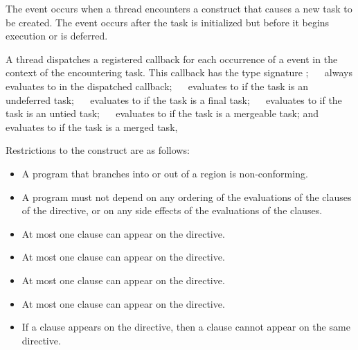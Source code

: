 \events

The  event occurs when a thread encounters a construct
that causes a new task to be created. The event occurs after the task is 
initialized but before it begins execution or is deferred.

\tools

A thread dispatches a registered  callback 
for each occurrence of a  event in the context of the 
encountering task. This callback has the type signature 
; 
\code{(}~\code{&}~ 
always evaluates to  in the dispatched callback;
\code{(}~\code{&}~ evaluates to  
if the task is an undeferred task; \code{(}~\code{&}~
evaluates to  if the task is a final task;
\code{(}~\code{&}~ evaluates to  if 
the task is an untied task; \code{(}~\code{&}~ 
evaluates to  if the task is a mergeable task; and
\code{(}~\code{&}~ evaluates to 
if the task is a merged task, 

\restrictions
Restrictions to the  construct are as follows:

\begin{itemize}
\item A program that branches into or out of a  region is non-conforming.
\item A program must not depend on any ordering of the evaluations of the clauses 
      of the  directive, or on any side effects of the evaluations of 
      the clauses.
\item At most one  clause can appear on the directive.
\item At most one  clause can appear on the directive.
\item At most one  clause can appear on the directive.
\item At most one  clause can appear on the directive.
\item If a  clause appears on the directive, then a  
      clause cannot appear on the same directive.

\end{itemize}

